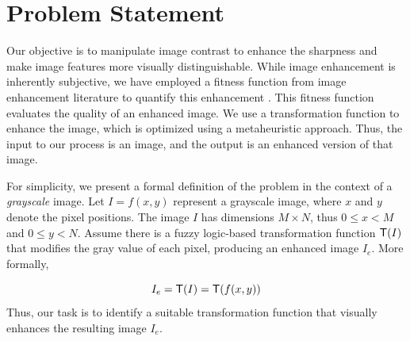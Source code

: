 \section{Problem Statement}
\label{section:problem}
Our objective is to manipulate image contrast to enhance the sharpness and make image features more visually distinguishable. While image enhancement is inherently subjective, we have employed a fitness function from image enhancement literature to quantify this enhancement \cite{bhandari2020cuckoo,draa2014artificial,dos2009differential,braik2007particle,munteanu2004gray}. This fitness function evaluates the quality of an enhanced image. We use a transformation function to enhance the image, which is optimized using a metaheuristic approach. Thus, the input to our process is an image, and the output is an enhanced version of that image.

For simplicity, we present a formal definition of the problem in the context of a {\em grayscale} image. Let $I = f(x, y)$ represent a grayscale image, where $x$ and $y$ denote the pixel positions. The image $I$ has dimensions $M \times N$, thus $0 \leq x < M$ and $0 \leq y < N$. Assume there is a fuzzy logic-based transformation function $\mathsf{T}(I)$ that modifies the gray value of each pixel, producing an enhanced image $I_e$. More formally,


\begin{equation} \label{eqn:transformation}
I_e = \mathsf{T}(I) = \mathsf{T}(f(x,y))
\end{equation}
Thus, our task is to identify a suitable transformation function that visually enhances the resulting image $I_e$.










